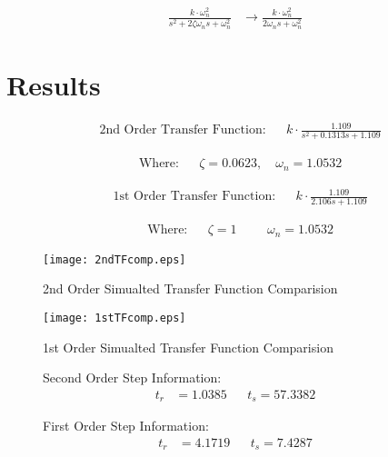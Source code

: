 \begin{align}
\frac { k\cdot \omega_{ n }^{ 2 } }{ s^2 + 2\zeta \omega_{ n }s+\omega_{ n }^{ 2 } } &\rightarrow \frac { k\cdot \omega_{ n }^{ 2 } }{ 2\omega_{ n }s+\omega_{ n }^{ 2 } }
\end{align}

\section{Results}\label{results}

\begin{align}
&\text{2nd Order Transfer Function}: && k \cdot \frac { 1.109 }{ s^{ 2 }+0.1313s+1.109 }
\end{align}

\begin{align*}
&\text{Where:} &&\zeta = 0.0623, \quad \omega_n = 1.0532
\end{align*}

\begin{align}
&\text{1st Order Transfer Function}: && k \cdot \frac { 1.109 }{ 2.106s+1.109 }
\end{align}

\begin{align*}
&\text{Where:} &&\zeta = 1 &&& \omega_n = 1.0532
\end{align*}

\begin{figure}[H]
\centering
\begin{minipage}{.49\textwidth}
\centering
\texttt{[image: 2ndTFcomp.eps]}
\caption{2nd Order Simualted Transfer Function Comparision}
\label{2ndTFcomp}
\end{minipage}
\hfill
\begin{minipage}{.49\textwidth}
  \centering
  \texttt{[image: 1stTFcomp.eps]}
  \caption{1st Order Simualted Transfer Function Comparision}
  \label{1stTFcomp}
\end{minipage}
\vspace{-11pt}
\end{figure}

\begin{figure}[H]
\centering
\begin{minipage}{.49\textwidth}
Second Order Step Information:
\begin{align*}
t_r &= 1.0385 &&t_s = 57.3382
\end{align*}
\end{minipage}
\hfill
\begin{minipage}{.49\textwidth}
First Order Step Information:
\begin{align*}
t_r &= 4.1719 &&t_s = 7.4287
\end{align*}
\end{minipage}
\vspace{-11pt}
\end{figure}

